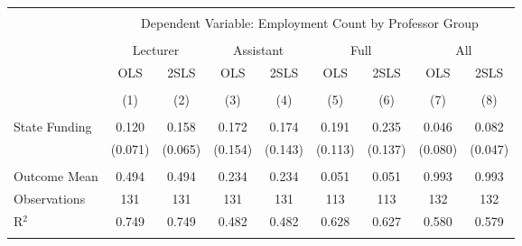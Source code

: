 
\begin{tabular}{@{\extracolsep{5pt}}lcccccccc} 
\\[-1.8ex]\hline 
\hline \\[-1.8ex] 
 & \multicolumn{8}{c}{Dependent Variable: Employment Count by Professor Group} \\ 
\cline{2-9} 
\\[-1.8ex] & \multicolumn{2}{c}{Lecturer} & \multicolumn{2}{c}{Assistant} & \multicolumn{2}{c}{Full} & \multicolumn{2}{c}{All} \\ 
 & OLS & 2SLS & OLS & 2SLS & OLS & 2SLS & OLS & 2SLS \\ 
\\[-1.8ex] & (1) & (2) & (3) & (4) & (5) & (6) & (7) & (8)\\ 
\hline \\[-1.8ex] 
 State Funding & 0.120 & 0.158 & 0.172 & 0.174 & 0.191 & 0.235 & 0.046 & 0.082 \\ 
  & (0.071) & (0.065) & (0.154) & (0.143) & (0.113) & (0.137) & (0.080) & (0.047) \\ 
 \hline \\[-1.8ex] 
Outcome Mean & 0.494 & 0.494 & 0.234 & 0.234 & 0.051 & 0.051 & 0.993 & 0.993 \\ 
Observations & 131 & 131 & 131 & 131 & 113 & 113 & 132 & 132 \\ 
R$^{2}$ & 0.749 & 0.749 & 0.482 & 0.482 & 0.628 & 0.627 & 0.580 & 0.579 \\ 
\hline 
\hline \\[-1.8ex] 
\end{tabular} 

